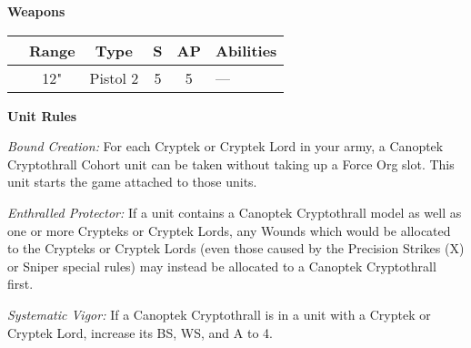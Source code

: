 \begin{minipage}[t]{0.72\textwidth}
	\vspace*{2em}
	\textbf{Weapons}
	
	\begin{tabular}{m{95 pt} *{4}{c} >{\raggedright\arraybackslash}p{130pt}}
		& Range & Type & S & AP & Abilities \\
		\hline
		\quickref{Scouring Eye} & 12" & Pistol 2 & 5 & 5 & — \\
	\end{tabular}
	
	\vspace*{2em}
	\textbf{Unit Rules}
	
	\textit{Bound Creation:} For each Cryptek or Cryptek Lord in your army, a Canoptek Cryptothrall Cohort unit can be taken without taking up a Force Org slot. This unit starts the game attached to those units.
	
	\textit{Enthralled Protector:} If a unit contains a Canoptek Cryptothrall model as well as one or more Crypteks or Cryptek Lords, any Wounds which would be allocated to the Crypteks or Cryptek Lords (even those caused by the Precision Strikes (X) or Sniper special rules) may instead be allocated to a Canoptek Cryptothrall first.
	
	\textit{Systematic Vigor:} If a Canoptek Cryptothrall is in a unit with a Cryptek or Cryptek Lord, increase its BS, WS, and A to 4.
\end{minipage}
\hspace{0.5em}


\newpage
